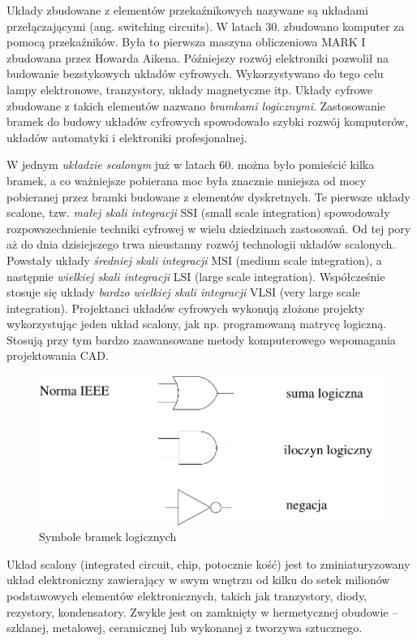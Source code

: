 \documentclass[a4paper,11pt]{article}
\begin{document}
Układy zbudowane z elementów przekaźnikowych nazywane są układami przełączającymi (ang. switching circuits).  W latach 30. zbudowano komputer za pomocą przekaźników. Była to pierwsza maszyna obliczeniowa MARK I zbudowana przez Howarda Aikena. Późniejszy rozwój elektroniki pozwolił na budowanie bezstykowych układów cyfrowych. Wykorzystywano do tego celu lampy elektronowe, tranzystory, układy magnetyczne itp. Układy cyfrowe zbudowane z takich elementów nazwano \emph{bramkami logicznymi}. Zastosowanie bramek do budowy układów cyfrowych spowodowało szybki rozwój komputerów, układów automatyki i elektroniki profesjonalnej.

W jednym \emph{układzie scalonym} już w latach 60. można było pomieścić kilka bramek, a co ważniejsze pobierana moc była znacznie mniejsza od mocy pobieranej przez bramki budowane z elementów dyskretnych. Te pierwsze układy scalone, tzw. \emph{małej skali integracji} SSI (small scale integration) spowodowały rozpowszechnienie techniki cyfrowej w wielu dziedzinach zastosowań. Od tej pory aż do dnia dzisiejszego trwa nieustanny rozwój technologii układów scalonych. Powstały układy \emph{średniej skali integracji} MSI (medium scale integration), a następnie \emph{wielkiej skali integracji} LSI (large scale integration). Współcześnie stosuje się układy \emph{bardzo wielkiej skali integracji} VLSI (very large scale integration). Projektanci układów cyfrowych wykonują złożone projekty wykorzystując jeden układ scalony, jak np. programowaną matrycę logiczną. Stosują przy tym bardzo zaawansowane metody komputerowego wspomagania projektowania CAD.

\begin{figure}[!htb]
\centerline{\includegraphics[scale=0.6]{source/symbole-bramek.pdf}}
\caption{Symbole bramek logicznych}
\label{fig:symboleBramekLogicznych}
\end{figure}

Układ scalony (integrated circuit, chip, potocznie kość) jest to zminiaturyzowany układ elektroniczny zawierający w swym wnętrzu od kilku do setek milionów podstawowych elementów elektronicznych, takich jak tranzystory, diody, rezystory, kondensatory. Zwykle jest on zamknięty w hermetycznej obudowie -- szklanej, metalowej, ceramicznej lub wykonanej z tworzywa sztucznego.
\end{document}
